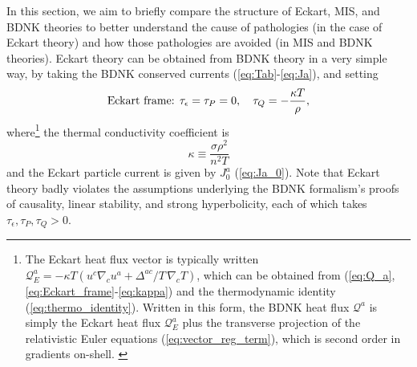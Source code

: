 \documentclass[%
notitlepage,
superscriptaddress,
nofootinbib,
amsmath,
amssymb,
aps,
twocolumn
]{revtex4-1}
\begin{document}
In this section, we aim to briefly compare the structure of Eckart, MIS,
and BDNK theories to better understand the cause of pathologies (in the
case of Eckart theory) and how those pathologies are avoided (in MIS and
BDNK theories). 
Eckart theory can be obtained from BDNK theory in a very
simple way, by taking the BDNK conserved currents
(\ref{eq:Tab}-\ref{eq:Ja}), and setting 
\begin{equation} \label{eq:Eckart_frame}
\textnormal{Eckart frame: } \tau_{\epsilon} = \tau_{P} = 0, ~~~ \tau_{Q} = -\frac{\kappa T}{\rho},
\end{equation}
where\footnote{The Eckart heat flux vector is typically written
  ${\mathcal{Q}^{a}_{E} = -\kappa T(u^{c}\nabla_{c} u^{a} + \Delta^{a c}/T
  \, \nabla_{c} T)}$, which can be obtained from
  (\ref{eq:Q_a},\ref{eq:Eckart_frame}-\ref{eq:kappa}) and the thermodynamic
  identity (\ref{eq:thermo_identity}).  Written in this form, the BDNK heat
  flux $\mathcal{Q}^{a}$ is simply the Eckart heat flux
  $\mathcal{Q}^{a}_{E}$ plus the transverse projection of the relativistic
  Euler equations (\ref{eq:vector_reg_term}), which is second order in
  gradients on-shell. \label{footnote:Eckart_heat_flux}} the thermal
  conductivity coefficient is
\begin{equation} \label{eq:kappa}
\kappa \equiv \frac{\sigma \rho^2}{n^2 T}
\end{equation}
and the Eckart particle current is given by $J^{a}_{0}$ (\ref{eq:Ja_0}).
Note that Eckart theory badly violates the assumptions underlying the BDNK
formalism's proofs of causality, linear stability, and strong
hyperbolicity, each of which takes $\tau_{\epsilon}, \tau_{P}, \tau_{Q} >
0$.
\end{document}
